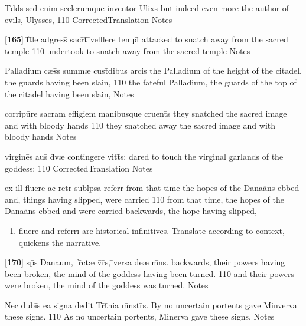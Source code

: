 \latline
  {T\={}d\={\macron {\i}}d\={}s sed enim scelerumque inventor Ulix\={}s}
  { but indeed even more the author of evils, Ulysses, }
  {110}
  { CorrectedTranslation }
  { Notes }


\latline
  {[\textbf{165}] f\={}t\={}le adgress\={\macron {\i}} sacr\={}t\={} \={}velllere templ\={}}
  { attacked to snatch away from the sacred temple }                
  {110}
  { undertook to snatch away from the sacred temple }
  { Notes }


\latline
  {Palladium c{\ae}s\={\macron {\i}}s summ{\ae} cust\={}dibus arcis}            
  { the Palladium of the height of the citadel, the guards having been slain,  }    
  {110}
  { the fateful Palladium, the guards of the top of the citadel having been slain,  }
  { Notes }


\latline
  {corripu\={}re sacram effigiem manibusque cruent\={\macron {\i}}s}    
  { they snatched the sacred image and with bloody hands  }      
  {110}
  { they snatched away the sacred image and with bloody hands  }
  { Notes }


\latline
  {virgine\={}s aus\={\macron {\i}} d\={\macron {\i}}v{\ae} contingere vitt\={}s:}
  { dared to touch the virginal garlands of the goddess:  }
  {110}
  { CorrectedTranslation }
  { Notes }


\latline
  {ex ill\={} fluere ac retr\={} subl\={}psa referr\={\macron {\i}}}
  { from that time the hopes of the Dana\"ans ebbed and, things having slipped, were carried }
  {110}
  { from that time, the hopes of the Dana\"ans ebbed and were carried backwards, the hope having slipped, }
  { \begin{enumerate}
  	\item fluere and referr\={\i} are historical infinitives.  Translate according to context, quickens the narrative.
  \end{enumerate} }


\latline
  {[\textbf{170}] sp\={}s Danaum, fr\={}ct{\ae} v\={\macron {\i}}r\={}s, \={}versa de{\ae} m\={}ns.}
  { backwards, their powers having been broken, the mind of the goddess having been turned. }       
  {110}
  { and their powers were broken, the mind of the goddess was turned. }             
  { Notes }


\latline
  {Nec dubi\={\macron {\i}}s ea signa dedit Tr\={\macron {\i}}t\={}nia m\={}nstr\={\macron {\i}}s.}
  { By no uncertain portents gave Minverva these signs. }
  {110}
  { As no uncertain portents, Minerva gave these signs. }
  { Notes }


